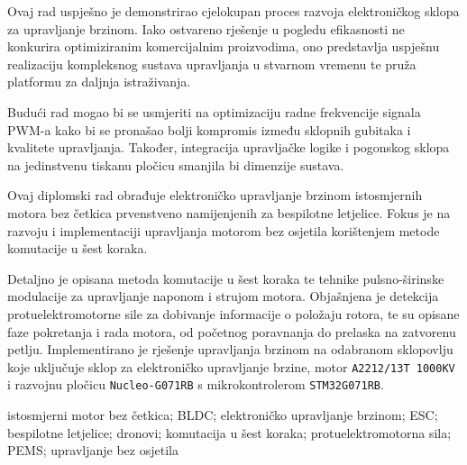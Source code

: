 \documentclass[diplomskirad]{fer}
\begin{document}
Ovaj rad uspješno je demonstrirao cjelokupan proces razvoja elektroničkog
sklopa za upravljanje brzinom. Iako ostvareno rješenje u pogledu efikasnosti ne
konkurira optimiziranim komercijalnim proizvodima, ono predstavlja uspješnu
realizaciju kompleksnog sustava upravljanja u stvarnom vremenu te pruža
platformu za daljnja istraživanja.

Budući rad mogao bi se usmjeriti na optimizaciju radne frekvencije signala
PWM-a kako bi se pronašao bolji kompromis između sklopnih gubitaka i kvalitete
upravljanja. Također, integracija upravljačke logike i pogonskog sklopa na
jedinstvenu tiskanu pločicu smanjila bi dimenzije sustava.





\begin{sazetak}

	Ovaj diplomski rad obrađuje elektroničko upravljanje brzinom istosmjernih
	motora bez četkica prvenstveno namijenjenih za bespilotne letjelice. Fokus je
	na razvoju i implementaciji upravljanja motorom bez osjetila korištenjem metode
	komutacije u šest koraka.

	Detaljno je opisana metoda komutacije u šest koraka te tehnike pulsno-širinske
	modulacije za upravljanje naponom i strujom motora. Objašnjena je detekcija
	protuelektromotorne sile za dobivanje informacije o položaju rotora, te su
	opisane faze pokretanja i rada motora, od početnog poravnanja do prelaska na
	zatvorenu petlju. Implementirano je rješenje upravljanja brzinom na odabranom
	sklopovlju koje uključuje sklop za elektroničko upravljanje brzine, motor
	\texttt{A2212/13T 1000KV} i razvojnu pločicu \texttt{Nucleo-G071RB} s
	mikrokontrolerom \texttt{STM32G071RB}.
\end{sazetak}

\begin{kljucnerijeci}
	istosmjerni motor bez četkica; BLDC; elektroničko upravljanje brzinom; ESC; bespilotne letjelice; dronovi; komutacija u šest koraka; protuelektromotorna sila; PEMS; upravljanje bez osjetila
\end{kljucnerijeci}
\end{document}
